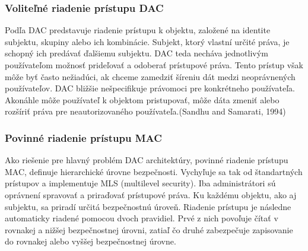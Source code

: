 \subsubsection{Voliteľné riadenie prístupu DAC}
Podľa \cite{TSCES} DAC predstavuje riadenie prístupu k objektu, založené na identite subjektu, skupiny alebo ich kombinácie. Subjekt, ktorý vlastní určité práva, je schopný ich predávať  ďalšiemu subjektu. DAC teda necháva jednotlivým používateľom možnosť prideľovať a odoberať prístupové práva. Tento prístup však môže byť často nežiadúci, ak chceme zamedziť šíreniu dát medzi neoprávnených používateľov. DAC bližšie nešpecifikuje právomoci pre konkrétneho používateľa. Akonáhle môže používateľ k objektom pristupovať, môže dáta zmeniť alebo rozšíriť práva pre neautorizovaného používateľa.(Sandhu and Samarati, 1994)


\subsubsection{Povinné riadenie prístupu MAC}
Ako riešenie pre hlavný problém DAC architektúry, povinné riadenie prístupu MAC, definuje hierarchické úrovne bezpečnosti. Vychyľuje sa tak od štandartných prístupov a implementuje MLS (multilevel security).  Iba administrátori sú oprávnení  spravovať a priraďovať prístupové práva. Ku každému objektu, ako aj subjektu, sa priradí určitá bezpečnostnú úroveň. Riadenie prístupu je následne automaticky riadené pomocou dvoch pravidiel. Prvé z nich povoľuje  čítať v rovnakej a nižšej bezpečnostnej úrovni, zatiaľ čo druhé zabezpečuje zapisovanie do rovnakej alebo vyššej bezpečnostnej úrovne. \cite{MAC}


